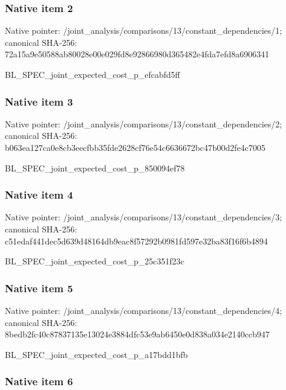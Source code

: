\documentclass[10pt,a4paper]{article}
\begin{document}
\subsubsection{Native item 2}


Native pointer: /joint\_analysis/comparis\allowbreak{}ons/13/constant\_dependen\allowbreak{}cies/1; canonical SHA-256: 72a15a9e50588ab80028e00e\allowbreak{}029fd8e92866980d365482e4\allowbreak{}fda7efd8a6906341


BL\_SPEC\_joint\_expected\_c\allowbreak{}ost\_p\_efcabfd5ff


\subsubsection{Native item 3}


Native pointer: /joint\_analysis/comparis\allowbreak{}ons/13/constant\_dependen\allowbreak{}cies/2; canonical SHA-256: b063ea127ca0e8cb3eecfbb3\allowbreak{}5fde2628cf76e54c6636672b\allowbreak{}c47b00d2fe4c7005


BL\_SPEC\_joint\_expected\_c\allowbreak{}ost\_p\_850094ef78


\subsubsection{Native item 4}


Native pointer: /joint\_analysis/comparis\allowbreak{}ons/13/constant\_dependen\allowbreak{}cies/3; canonical SHA-256: c51edaf441dec5d639d48164\allowbreak{}db9eac8f57292b0981fd597e\allowbreak{}32ba83f16f6b4894


BL\_SPEC\_joint\_expected\_c\allowbreak{}ost\_p\_25c351f23c


\subsubsection{Native item 5}


Native pointer: /joint\_analysis/comparis\allowbreak{}ons/13/constant\_dependen\allowbreak{}cies/4; canonical SHA-256: 8bedb2fc40c87837135e1302\allowbreak{}4e3884dfc53e9ab6450e0d83\allowbreak{}8a034e2140ccb947


BL\_SPEC\_joint\_expected\_c\allowbreak{}ost\_p\_a17bdd1bfb


\subsubsection{Native item 6}
\end{document}
